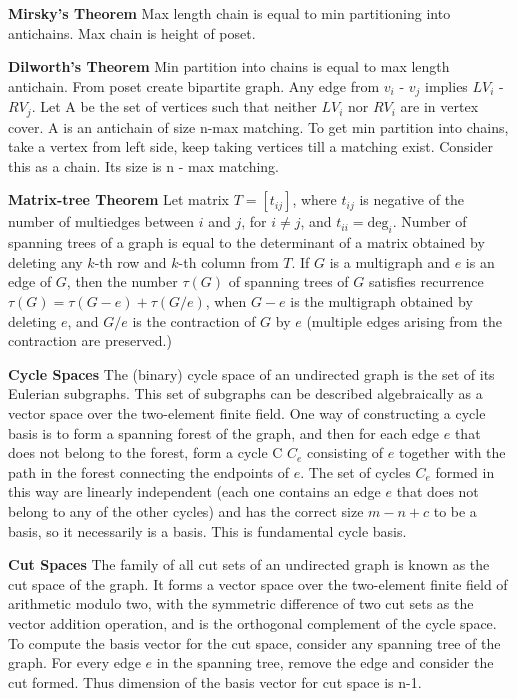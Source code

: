 \textbf{Mirsky's Theorem} Max length chain is equal to min partitioning into antichains. Max chain is height of poset.

\textbf{Dilworth's Theorem} Min partition into chains is equal to max length antichain. From poset create bipartite graph. Any edge from $v_{i}$ - $v_{j}$ implies  $LV_{i}$ - $RV_{j}$. Let A be the set of vertices such that neither $LV_{i}$ nor $RV_{i}$ are in vertex cover. A is an antichain of size n-max matching. To get min partition into chains, take a vertex from left side, keep taking vertices till a matching exist. Consider this as a chain. Its size is n - max matching.

\textbf{Matrix-tree Theorem} Let matrix $T = [t_{ij}]$, where $t_{ij}$ is negative of the number of multiedges between $i$ and $j$, for $i \ne j$, and $t_{ii} = \mbox{deg}_i$. Number of spanning trees of a graph is equal to the determinant of a matrix obtained by deleting any $k$-th row and $k$-th column from $T$. If $G$ is a multigraph and $e$ is an edge of $G$, then the number $\tau(G)$ of spanning trees of $G$ satisfies recurrence $\tau(G) = \tau(G-e) + \tau(G/e)$, when $G-e$ is the multigraph obtained by deleting $e$, and $G/e$ is the contraction of $G$ by $e$ (multiple edges arising from the contraction are preserved.)

\textbf{Cycle Spaces} The (binary) cycle space of an undirected graph is the set of its Eulerian subgraphs. This set of subgraphs can be described algebraically as a vector space over the two-element finite field. One way of constructing a cycle basis is to form a spanning forest of the graph, and then for each edge $e$ that does not belong to the forest, form a cycle C  $C_{e}$ consisting of $e$ together with the path in the forest connecting the endpoints of $e$. The set of cycles $C_{e}$ formed in this way are linearly independent (each one contains an edge $e$ that does not belong to any of the other cycles) and has the correct size $m - n + c$ to be a basis, so it necessarily is a basis. This is fundamental cycle basis.

\textbf{Cut Spaces} The family of all cut sets of an undirected graph is known as the cut space of the graph. It forms a vector space over the two-element finite field of arithmetic modulo two, with the symmetric difference of two cut sets as the vector addition operation, and is the orthogonal complement of the cycle space. To compute the basis vector for the cut space, consider any spanning tree of the graph. For every edge $e$ in the spanning tree, remove the edge and consider the cut formed. Thus dimension of the basis vector for cut space is n-1.

